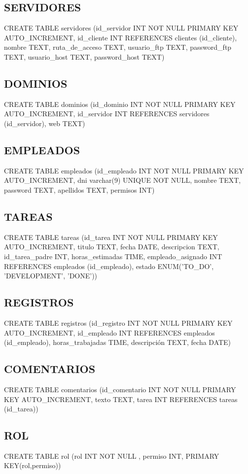 \documentclass[paper=a4, fontsize=11pt, spanish]{scrartcl}
\begin{document}
\subsection{SERVIDORES}
CREATE TABLE servidores (id\_servidor INT NOT NULL PRIMARY KEY AUTO\_INCREMENT, id\_cliente INT REFERENCES clientes (id\_cliente), nombre TEXT,  ruta\_de\_acceso TEXT, usuario\_ftp TEXT, password\_ftp TEXT, usuario\_host TEXT, password\_host TEXT)

\subsection{DOMINIOS}
CREATE TABLE dominios (id\_dominio INT NOT NULL PRIMARY KEY AUTO\_INCREMENT, id\_servidor INT REFERENCES servidores (id\_servidor), web TEXT)

\subsection{EMPLEADOS}
CREATE TABLE empleados (id\_empleado INT NOT NULL PRIMARY KEY AUTO\_INCREMENT, dni varchar(9) UNIQUE NOT NULL,  nombre TEXT, password TEXT, apellidos TEXT, permisos INT)

\subsection{TAREAS}
CREATE TABLE tareas (id\_tarea INT NOT NULL PRIMARY KEY AUTO\_INCREMENT, titulo TEXT, fecha DATE, descripcion TEXT, id\_tarea\_padre INT, horas\_estimadas TIME, empleado\_asignado INT REFERENCES empleados (id\_empleado), estado ENUM('TO_DO', 'DEVELOPMENT', 'DONE'))

\subsection{REGISTROS}
CREATE TABLE registros (id\_registro INT NOT NULL PRIMARY KEY AUTO\_INCREMENT, id\_empleado INT REFERENCES empleados (id\_empleado), horas\_trabajadas TIME, descripción TEXT, fecha DATE)

\subsection{COMENTARIOS}
CREATE TABLE comentarios (id\_comentario INT NOT NULL PRIMARY KEY AUTO\_INCREMENT, texto TEXT, tarea INT REFERENCES tareas (id\_tarea))

\subsection{ROL}
CREATE TABLE rol (rol INT NOT NULL , permiso INT, PRIMARY KEY(rol,permiso))
\end{document}
